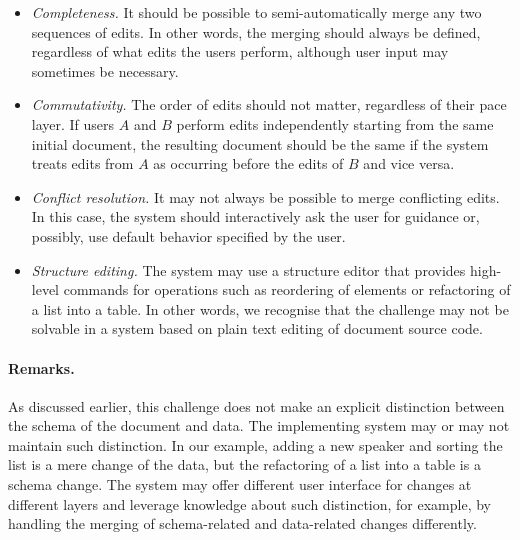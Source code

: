 \documentclass[english,submission]{programming}
\begin{document}
\begin{itemize}
\item \emph{Completeness.} It should be possible to semi-automatically merge any two sequences
  of edits. In other words, the merging should always be defined, regardless of what edits the
  users perform, although user input may sometimes be necessary.
\item \emph{Commutativity.} The order of edits should not matter, regardless of their pace layer.
  If users $A$ and $B$ perform edits independently starting from the same initial document, the
  resulting document should be the same if the system treats edits from $A$ as occurring before
  the edits of $B$ and vice versa.
\item \emph{Conflict resolution.} It may not always be possible to merge conflicting edits.
  In this case, the system should interactively ask the user for guidance or, possibly, use
  default behavior specified by the user.
\item \emph{Structure editing.} The system may use a structure editor that provides high-level
  commands for operations such as reordering of elements or refactoring of a list into a table.
  In other words, we recognise that the challenge may not be solvable in a system based on plain
  text editing of document source code.
\end{itemize}

\paragraph{Remarks.}
As discussed earlier, this challenge does not make an explicit distinction between the schema
of the document and data. The implementing system may or may not maintain such distinction.
In our example, adding a new speaker and sorting the list is a mere change of the data, but the
refactoring of a list into a table is a schema change. The system may offer different user interface
for changes at different layers and leverage knowledge about such distinction, for example,
by handling the merging of schema-related and data-related changes differently.
\end{document}
